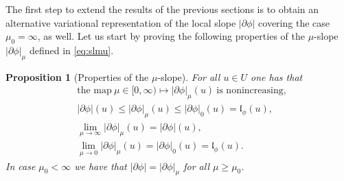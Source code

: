 \documentclass[reqno]{amsart}
\renewcommand{\sl}{|\partial \phi|}
\newcommand{\gl}{\mathfrak{l}_\phi}
\newtheorem{proposition}[theorem]{Proposition}
\begin{document}
The first step to extend the results of the previous sections  is to obtain an alternative
variational representation of the local slope $\sl$  covering the
case $\mu_0=\infty$, as well.  
 Let us start by proving the following properties of the
$\mu$-slope $\sl_\mu$ defined in \eqref{eq:slmu}.
\begin{proposition}[Properties of the $\mu$-slope]
  For all  $u\in U$ one has that
  \begin{align}
    &\text{the map} \ \mu\in [0,\infty) \mapsto \sl_\mu(u) \ \text{is nonincreasing},\label{eq:mu0}\\[2mm]
    &\sl(u) \leq \sl_\mu(u)
  \leq  \sl_0(u)=  \gl(u),
      \label{eq:mu1}\\[2mm]
    &\lim_{\mu\to \infty}\sl_\mu(u) = \sl(u), \label{eq:mu2}\\
    &\lim_{\mu\to 0}\sl_\mu(u) =  \sl_0(u)=  \gl(u). \label{eq:mu3}
  \end{align}
In case $\mu_0 <\infty$ we have that $\sl  = \sl_\mu
$ for all $\mu\geq \mu_0$.
\end{proposition}
\end{document}
